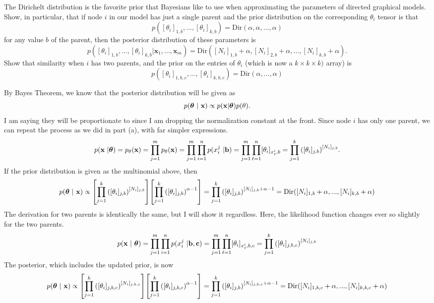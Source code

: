 The Dirichelt distribution is the favorite prior that Bayesians like to use when approximating the parameters of directed graphical models. Show, in particular, that if node $i$ in our model has just a single parent and the prior distribution on the corresponding $\theta_i$ tensor is that 
\[p([\theta_i]_{1, b}, ..., [\theta_i]_{k, b}) = \text{Dir}(\alpha, \alpha, ..., \alpha)\]
for any value $b$ of the parent, then the posterior distribution of these parameters is 
\[p([\theta_i]_{1, b}, ..., [\theta_i]_{k, b} | \textbf{x}_1, ..., \textbf{x}_m) = \text{Dir}([N_i]_{1, b} + \alpha, [N_i]_{2, b} + \alpha, ..., [N_i]_{k, b} + \alpha).\]
Show that similarity when $i$ has two parents, and the prior on the entries of $\theta_i$ (which is now a $k\times k\times k)$ array) is 
\[p([\theta_i]_{1, b, c}, ..., [\theta_i]_{k, b, c}) = \text{Dir}(\alpha, ..., \alpha)\]
\partbreak
\begin{solution}

    By Bayes Theorem, we know that the posterior distribution will be given as 
    \[p(\boldsymbol{\theta} \ |\  \textbf{x}) \propto p(\textbf{x} | \boldsymbol{\theta})p(\theta).\]
    I am saying they will be proportionate to since I am dropping the normalization constant at the front. Since node $i$ has only one parent, we can repeat the process as we did in part (a), with far simpler expressions. 
    \[p(\textbf{x} \ | \boldsymbol{\theta}) = p_\theta(\textbf{x}) = \prod_{j = 1}^mp_\theta(\textbf{x}) = \prod_{j = 1}^m\prod_{i = 1}^n p(x_i^j \ | \textbf{b}) = \prod_{j = 1}^m\prod_{\ell = 1}^n [\theta_i]_{x_\ell^i, b} = \prod_{j  =1}^k \qty([\theta_i]_{j, b})^{[N_i]_{j, b}}.\]
    If the prior distribution is given as the multinomial above, then
    \[p(\boldsymbol{\theta} \ | \ \textbf{x}) \propto \qty[\prod_{j = 1}^k\qty([\theta_i]_{j, b})^{[N_i]_{j, b}}]\qty[\prod_{j = 1}^k \qty([\theta_i]_{j, b})^{\alpha - 1}] = \prod_{j = 1}^k \qty([\theta_i]_{j, b})^{[N_i]_{j, b} + \alpha - 1} = \text{Dir}\qty([N_i]_{1, b} + \alpha, ..., [N_i]_{k, b} + \alpha)\]
    The derivation for two parents is identically the same, but I will show it regardless. Here, the likelihood function changes ever so slightly for the two parents. 
    \[p(\textbf{x} \ | \ \boldsymbol{\theta} ) = \prod_{j = 1}^m\prod_{i = 1}^n p(x_i^j \ | \textbf{b}, \textbf{c}) = \prod_{j  =1}^m\prod_{\ell = 1}^n [\theta_i]_{x_\ell^i, b, c} = \prod_{j = 1}^k \qty([\theta_i]_{j, b, c})^{[N_i]_{j, b}}\]
    The posterior, which includes the updated prior, is now
    \[p(\boldsymbol{\theta} \ | \ \textbf{x}) \propto \qty[\prod_{j = 1}^k\qty([\theta_i]_{j, b, c})^{[N_i]_{j, b, c}}]\qty[\prod_{j = 1}^k \qty([\theta_i]_{j, b, c})^{\alpha - 1}] = \prod_{j = 1}^k \qty([\theta_i]_{j, b})^{[N_i]_{j, b, c} + \alpha - 1} = \text{Dir}\qty([N_i]_{1, b, c} + \alpha, ..., [N_i]_{k, b, c} + \alpha)\]
    
\end{solution}

